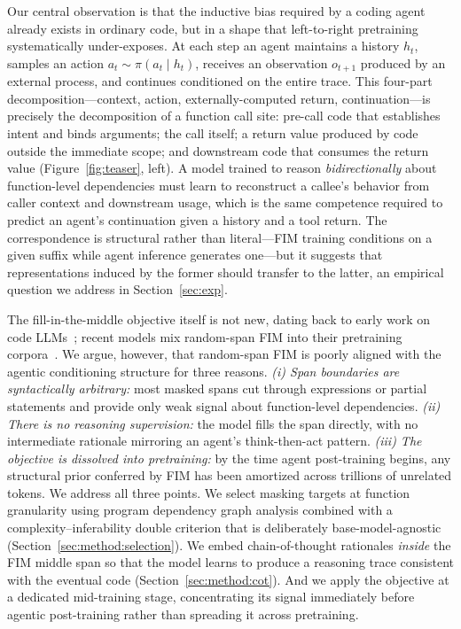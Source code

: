 Our central observation is that the inductive bias required by a coding
agent already exists in ordinary code, but in a shape that left-to-right
pretraining systematically under-exposes. At each step an agent maintains a
history $h_t$, samples an action $a_t \sim \pi(a_t \mid h_t)$, receives an
observation $o_{t+1}$ produced by an external process, and continues
conditioned on the entire trace. This four-part decomposition---context,
action, externally-computed return, continuation---is precisely the
decomposition of a function call site: pre-call code that establishes intent
and binds arguments; the call itself; a return value produced by code
outside the immediate scope; and downstream code that consumes the return
value (Figure~\ref{fig:teaser}, left). A model trained to reason
\emph{bidirectionally} about function-level dependencies must learn to
reconstruct a callee's behavior from caller context and downstream usage,
which is the same competence required to predict an agent's continuation
given a history and a tool return. The correspondence is structural rather
than literal---FIM training conditions on a given suffix while agent
inference generates one---but it suggests that representations induced by
the former should transfer to the latter, an empirical question we address
in Section~\ref{sec:exp}.

The fill-in-the-middle objective itself is not new, dating back to early
work on code LLMs~\citep{bavarian2022fim}; recent models mix random-span
FIM into their pretraining
corpora~\citep{qwencoder, deepseekcoder, starcoder}. We
argue, however, that random-span FIM is poorly aligned with the agentic
conditioning structure for three reasons. \emph{(i) Span boundaries are
syntactically arbitrary:} most masked spans cut through expressions or
partial statements and provide only weak signal about function-level
dependencies. \emph{(ii) There is no reasoning supervision:} the model
fills the span directly, with no intermediate rationale mirroring an
agent's think-then-act pattern. \emph{(iii) The objective is dissolved
into pretraining:} by the time agent post-training begins, any structural
prior conferred by FIM has been amortized across trillions of unrelated
tokens. We address all three points. We select masking targets at function
granularity using program dependency graph analysis combined with a
complexity--inferability double criterion that is deliberately
base-model-agnostic (Section~\ref{sec:method:selection}). We embed
chain-of-thought rationales \emph{inside} the FIM middle span so that the
model learns to produce a reasoning trace consistent with the eventual
code (Section~\ref{sec:method:cot}). And we apply the objective at a
dedicated mid-training stage, concentrating its signal immediately before
agentic post-training rather than spreading it across pretraining.

